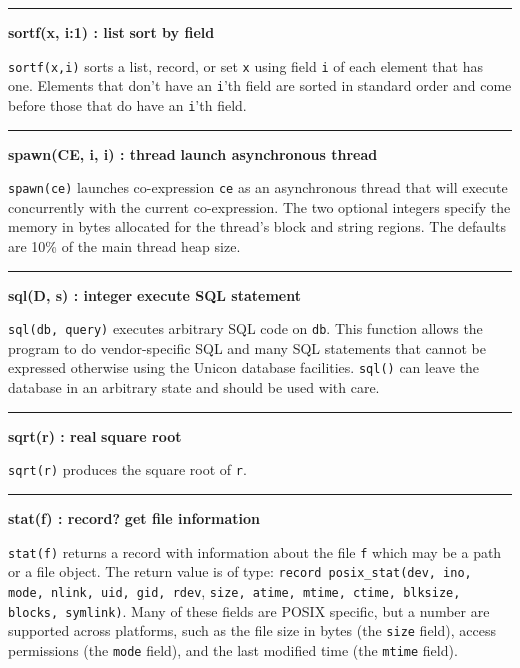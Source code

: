 \bigskip\hrule\vspace{0.1cm}
\noindent
{\bf sortf(x, i:1) : list } \hfill {\bf sort by field}

\noindent
{}\texttt{sortf(x,i)} sorts a list, record, or set
\texttt{x} using field \texttt{i} of each element that has one.
Elements that don't have an
\texttt{i}'th field are sorted in standard order and
come before those that do have an \texttt{i}'th field.

\bigskip\hrule\vspace{0.1cm}
\noindent
{\bf spawn(CE, i, i) : thread } \hfill {\bf launch asynchronous thread}

\noindent
{}\texttt{spawn(ce)} launches co-expression \texttt{ce} as an
asynchronous thread that will execute concurrently with the current
co-expression. The two optional integers specify the memory in bytes
allocated for the thread's block and string regions. The defaults are 10\%
of the main thread heap size.

\bigskip\hrule\vspace{0.1cm}
\noindent
{\bf sql(D, s) : integer } \hfill {\bf execute SQL statement}

\noindent
{}\texttt{sql(db, query)} executes arbitrary SQL code on
\texttt{db}. This function allows the program to do vendor-specific SQL
and many SQL statements that cannot be expressed otherwise using the
Unicon database facilities. \texttt{sql()} can leave the database in an
arbitrary state and should be used with care.

\bigskip\hrule\vspace{0.1cm}
\noindent
{\bf sqrt(r) : real } \hfill {\bf square root}

\noindent
{}\texttt{sqrt(r)} produces the square root of
\texttt{r}.

\bigskip\hrule\vspace{0.1cm}
\noindent
{\bf stat(f) : record? } \hfill {\bf get file information}

\noindent
{}\texttt{stat(f)} returns a record
with information about the file \texttt{f} which may be a path or a
file object. The return value is of type:
\texttt{record posix\_stat(dev, ino, mode, nlink, uid, gid, rdev},
\texttt{size, atime, mtime, ctime, blksize, blocks, symlink)}.
Many of these fields are POSIX
specific, but a number are supported across platforms, such as the
file size in bytes (the \texttt{size} field), access
permissions (the \texttt{mode} field), and the last modified time (the
\texttt{mtime} field).


